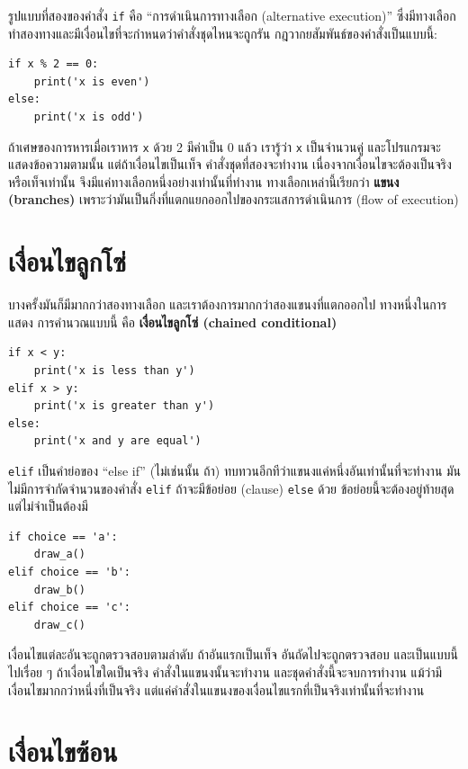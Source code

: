 รูปแบบที่สองของคำสั่ง {\tt if} คือ ``การดำเนินการทางเลือก (alternative execution)''
ซึ่งมีทางเลือกทำสองทางและมีเงื่อนไขที่จะกำหนดว่าคำสั่งชุดไหนจะถูกรัน กฎวากยสัมพันธ์ของคำสั่งเป็นแบบนี้:

\begin{verbatim}
if x % 2 == 0:
    print('x is even')
else:
    print('x is odd')
\end{verbatim}
%
ถ้าเศษของการหารเมื่อเราหาร {\tt x} ด้วย 2 มีค่าเป็น 0 แล้ว เรารู้ว่า {\tt x} เป็นจำนวนคู่
และโปรแกรมจะแสดงข้อความตามนั้น  แต่ถ้าเงื่อนไขเป็นเท็จ คำสั่งชุดที่สองจะทำงาน
เนื่องจากเงื่อนไขจะต้องเป็นจริงหรือเท็จเท่านั้น จึงมีแค่ทางเลือกหนึ่งอย่างเท่านั้นที่ทำงาน
ทางเลือกเหล่านี้เรียกว่า {\bf แขนง (branches)} 
เพราะว่ามันเป็นกิ่งที่แตกแยกออกไปของกระแสการดำเนินการ (flow of execution)



\section{เงื่อนไขลูกโซ่} %

บางครั้งมันก็มีมากกว่าสองทางเลือก และเราต้องการมากกว่าสองแขนงที่แตกออกไป ทางหนึ่งในการแสดง
การคำนวณแบบนี้ คือ {\bf เงื่อนไขลูกโซ่ (chained conditional)}

\begin{verbatim}
if x < y:
    print('x is less than y')
elif x > y:
    print('x is greater than y')
else:
    print('x and y are equal')
\end{verbatim}
%
{\tt elif} เป็นคำย่อของ ``else if'' (ไม่เช่นนั้น ถ้า) ทบทวนอีกทีว่าแขนงแค่หนึ่งอันเท่านั้นที่จะทำงาน
มันไม่มีการจำกัดจำนวนของคำสั่ง {\tt elif}  ถ้าจะมีข้อย่อย (clause) {\tt else} ด้วย 
ข้อย่อยนี้จะต้องอยู่ท้ายสุด แต่ไม่จำเป็นต้องมี

\begin{verbatim}
if choice == 'a':
    draw_a()
elif choice == 'b':
    draw_b()
elif choice == 'c':
    draw_c()
\end{verbatim}
%
เงื่อนไขแต่ละอันจะถูกตรวจสอบตามลำดับ ถ้าอันแรกเป็นเท็จ อันถัดไปจะถูกตรวจสอบ และเป็นแบบนี้ไปเรื่อย ๆ
ถ้าเงื่อนไขใดเป็นจริง คำสั่งในแขนงนั้นจะทำงาน และชุดคำสั่งนี้จะจบการทำงาน
แม้ว่ามีเงื่อนไขมากกว่าหนึ่งที่เป็นจริง แต่แค่คำสั่งในแขนงของเงื่อนไขแรกที่เป็นจริงเท่านั้นที่จะทำงาน


\section{เงื่อนไขซ้อน} %

